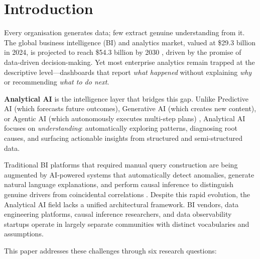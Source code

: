 \documentclass[preprint,12pt,authoryear]{elsarticle}
\theoremstyle{definition}
\begin{document}
\linenumbers

\section{Introduction}\label{sec:introduction}

Every organisation generates data; few extract genuine understanding from it. The global business intelligence (BI) and analytics market, valued at \$29.3 billion in 2024, is projected to reach \$54.3 billion by 2030 \citep{grandview2025bi}, driven by the promise of data-driven decision-making. Yet most enterprise analytics remain trapped at the descriptive level---dashboards that report \emph{what happened} without explaining \emph{why} or recommending \emph{what to do next}.

\textbf{Analytical AI} is the intelligence layer that bridges this gap. Unlike Predictive AI (which forecasts future outcomes), Generative AI (which creates new content), or Agentic AI (which autonomously executes multi-step plans) \citep{mahdi2026taxonomy}, Analytical AI focuses on \emph{understanding}: automatically exploring patterns, diagnosing root causes, and surfacing actionable insights from structured and semi-structured data.

Traditional BI platforms that required manual query construction are being augmented by AI-powered systems that automatically detect anomalies, generate natural language explanations, and perform causal inference to distinguish genuine drivers from coincidental correlations \citep{gartner2024augmented}. Despite this rapid evolution, the Analytical AI field lacks a unified architectural framework. BI vendors, data engineering platforms, causal inference researchers, and data observability startups operate in largely separate communities with distinct vocabularies and assumptions.

This paper addresses these challenges through six research questions:
\end{document}
